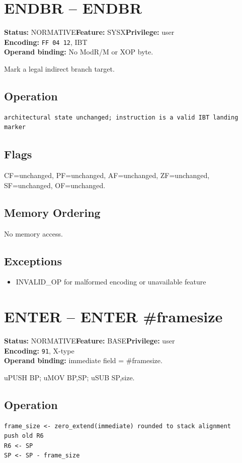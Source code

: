 \documentclass[10pt]{article}
\begin{document}
\section{ENDBR -- ENDBR}
\textbf{Status:} NORMATIVE\quad \textbf{Feature:} SYSX\quad \textbf{Privilege:} user\\
\textbf{Encoding:} \texttt{FF 04 12}, IBT\\
\textbf{Operand binding:} No ModR/M or XOP byte.

Mark a legal indirect branch target.

\subsection*{Operation}
\begin{lstlisting}
architectural state unchanged; instruction is a valid IBT landing marker
\end{lstlisting}
\subsection*{Flags}
CF=unchanged, PF=unchanged, AF=unchanged, ZF=unchanged, SF=unchanged, OF=unchanged.
\subsection*{Memory Ordering}
No memory access.
\subsection*{Exceptions}
\begin{itemize}
\item INVALID\_OP for malformed encoding or unavailable feature
\end{itemize}
\clearpage

\section{ENTER -- ENTER \#framesize}
\textbf{Status:} NORMATIVE\quad \textbf{Feature:} BASE\quad \textbf{Privilege:} user\\
\textbf{Encoding:} \texttt{91}, X-type\\
\textbf{Operand binding:} immediate field = \#framesize.

uPUSH BP; uMOV BP,SP; uSUB SP,size.

\subsection*{Operation}
\begin{lstlisting}
frame_size <- zero_extend(immediate) rounded to stack alignment
push old R6
R6 <- SP
SP <- SP - frame_size
\end{lstlisting}
\end{document}
